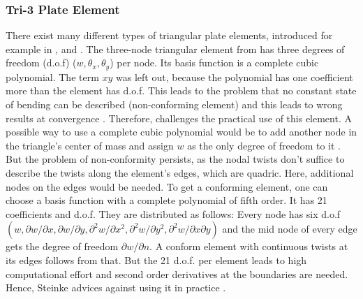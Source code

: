   \subsubsection{Tri-3 Plate Element}\label{sec:Shell-Plate-Tri}
  There exist many different types of triangular plate elements, introduced for example in \cite{batoz1980study}, \cite{tocher1963analysis} and \cite{specht1988modified}. The three-node triangular element from \cite{tocher1963analysis} has three degrees of freedom (d.o.f) ($w, \theta_x, \theta_y$) per node. Its basis function is a complete cubic polynomial. The term $xy$ was left out, because the polynomial has one coefficient more than the element has d.o.f. This leads to the problem that no constant state of bending can be described (non-conforming element) and this leads to wrong results at convergence \cite{steinke2005finite}. Therefore, \cite{steinke2005finite} challenges the practical use of this element. A possible way to use a complete cubic polynomial would be to add another node in the triangle's center of mass and assign $w$ as the only degree of freedom to it \cite{steinke2005finite}. But the problem of non-conformity persists, as the nodal twists don't suffice to describe the twists along the element's edges, which are quadric. Here, additional nodes on the edges would be needed. To get a conforming element, one can choose a basis function with a complete polynomial of fifth order. It has 21 coefficients and d.o.f. They are distributed as follows: Every node has six d.o.f $(w, \partial w/\partial x, \partial w/\partial y, \partial^2 w/\partial x^2, \partial^2 w/\partial y^2, \partial^2 w/\partial x\partial y)$ and the mid node of every edge gets the degree of freedom $\partial w/\partial n$. A conform element with continuous twists at its edges follows from that. But the 21 d.o.f. per element leads to high computational effort and second order derivatives at the boundaries are needed. Hence, Steinke advices against using it in practice \cite{steinke2005finite}.
  
